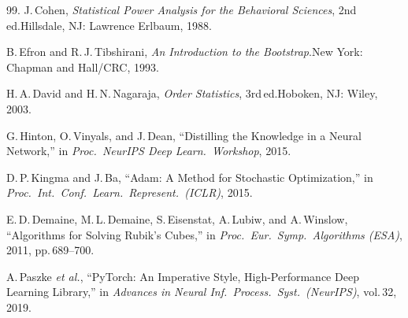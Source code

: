 \documentclass[graybox]{svmult}
\begin{document}
\begin{thebibliography}{99.}
J.\,Cohen, \textit{Statistical Power Analysis for the Behavioral
Sciences}, 2nd\,ed.\quad Hillsdale, NJ: Lawrence Erlbaum, 1988.

B.\,Efron and R.\,J.\,Tibshirani, \textit{An Introduction to the
Bootstrap}.\quad New York: Chapman and Hall/CRC, 1993.

H.\,A.\,David and H.\,N.\,Nagaraja, \textit{Order Statistics},
3rd\,ed.\quad Hoboken, NJ: Wiley, 2003.

G.\,Hinton, O.\,Vinyals, and J.\,Dean, ``Distilling the Knowledge
in a Neural Network,'' in \textit{Proc.\ NeurIPS Deep Learn.\
Workshop}, 2015.

D.\,P.\,Kingma and J.\,Ba, ``{A}dam: A Method for Stochastic
Optimization,'' in \textit{Proc.\ Int.\ Conf.\ Learn.\ Represent.\
(ICLR)}, 2015.

E.\,D.\,Demaine, M.\,L.\,Demaine, S.\,Eisenstat, A.\,Lubiw, and
A.\,Winslow, ``Algorithms for Solving {R}ubik's {C}ubes,'' in
\textit{Proc.\ Eur.\ Symp.\ Algorithms (ESA)}, 2011,
pp.\,689--700.

A.\,Paszke \textit{et al.}, ``{P}y{T}orch: An Imperative Style,
High-Performance Deep Learning Library,'' in \textit{Advances in
Neural Inf.\ Process.\ Syst.\ (NeurIPS)}, vol.\,32, 2019.

\end{thebibliography}
\end{document}
